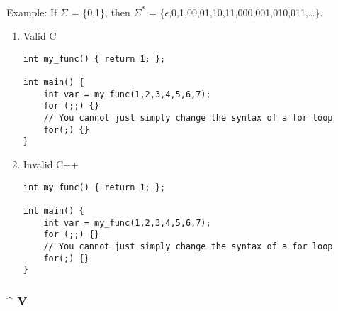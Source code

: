 \documentclass[11pt]{article}
\begin{document}
Example: If \(\Sigma\) = \{0,1\}, then \(\Sigma\)\textsuperscript{*} = \{\(\epsilon\),0,1,00,01,10,11,000,001,010,011,\ldots{}\}.
\begin{enumerate}
\item Valid C
\label{sec:orgcc9c6af}
\begin{verbatim}
int my_func() { return 1; };

int main() {
    int var = my_func(1,2,3,4,5,6,7);
    for (;;) {}
    // You cannot just simply change the syntax of a for loop
    for(;) {}
}
\end{verbatim}
\item Invalid C++
\label{sec:orga547a80}
\begin{verbatim}
int my_func() { return 1; };

int main() {
    int var = my_func(1,2,3,4,5,6,7);
    for (;;) {}
    // You cannot just simply change the syntax of a for loop
    for(;) {}
}
\end{verbatim}
\end{enumerate}
\subsubsection{\textlnot{} \^{} V}
\label{sec:org372e4a8}
\all
\end{document}
